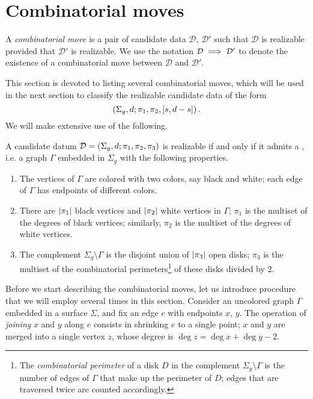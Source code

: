 \documentclass{article}
\begin{document}
\section{Combinatorial moves}

\begin{definition}
A \emph{combinatorial move} is a pair of candidate data $\mathcal{D}$, $\mathcal{D}'$ such that $\mathcal{D}$ is realizable provided that $\mathcal{D}'$ is realizable. We use the notation $\mathcal{D}\implies\mathcal{D}'$ to denote the existence of a combinatorial move between $\mathcal{D}$ and $\mathcal{D}'$.
\end{definition}

This section is devoted to listing several combinatorial moves, which will be used in the next section to classify the realizable candidate data of the form
\[
\left(\Sigma_g,d;\pi_1,\pi_2,[s,d-s]\right).
\]
We will make extensive use of the following.

\begin{fact*}
A candidate datum $\mathcal{D}=\left(\Sigma_g,d;\pi_1,\pi_2,\pi_3\right)$ is realizable if and only if it admits a \dessin{}, i.e. a graph $\Gamma$ embedded in $\Sigma_g$ with the following properties.
\begin{enumerate}
\item The vertices of $\Gamma$ are colored with two colors, say black and white; each edge of $\Gamma$ has endpoints of different colors.
\item There are $\left|\pi_1\right|$ black vertices and $\left|\pi_2\right|$ white vertices in $\Gamma$; $\pi_1$ is the multiset of the degrees of black vertices; similarly, $\pi_2$ is the multiset of the degrees of white vertices.
\item The complement $\Sigma_g\setminus\Gamma$ is the disjoint union of $\left|\pi_3\right|$ open disks; $\pi_3$ is the multiset of the combinatorial perimeters\footnote{The \emph{combinatorial perimeter} of a disk $D$ in the complement $\Sigma_g\setminus\Gamma$ is the number of edges of $\Gamma$ that make up the perimeter of $D$; edges that are traversed twice are counted accordingly.} of these disks divided by $2$.
\end{enumerate}
\end{fact*}

Before we start describing the combinatorial moves, let us introduce  procedure that we will employ several times in this section. Consider an uncolored graph $\Gamma$ embedded in a surface $\Sigma$, and fix an edge $e$ with endpoints $x$, $y$. The operation of \emph{joining} $x$ and $y$ along $e$ consists in shrinking $e$ to a single point; $x$ and $y$ are merged into a single vertex $z$, whose degree is $\deg{z}=\deg{x}+\deg{y}-2$.
\end{document}
